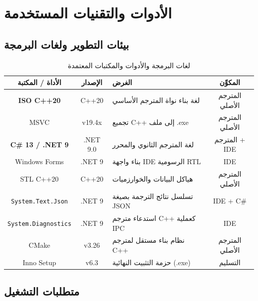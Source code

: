 \documentclass[12pt,a4paper]{report}
\begin{document}
\chapter{الأدوات والتقنيات المستخدمة}

\section{بيئات التطوير ولغات البرمجة}

\begin{table}[H]
\caption{\arabicfont لغات البرمجة والأدوات والمكتبات المعتمدة}
\label{tab:tools}
\centering
\begin{tabularx}{\textwidth}{|c|c|X|c|}
\hline
\rowcolor{TableHead}
\textbf{\arabicfont الأداة / المكتبة} & \textbf{\arabicfont الإصدار} & \textbf{\arabicfont الغرض} & \textbf{\arabicfont المكوِّن} \\
\hline
\textbf{ISO C++20} & C++20 & \arabicfont لغة بناء نواة المترجم الأساسي & \arabicfont المترجم الأصلي \\
\hline
\rowcolor{TableAlt}
MSVC & v19.4x & \arabicfont تجميع C++ إلى ملف .exe & \arabicfont المترجم الأصلي \\
\hline
\textbf{C\# 13 / .NET 9} & .NET 9.0 & \arabicfont لغة المترجم الثانوي والمحرر & \arabicfont المترجم + IDE \\
\hline
\rowcolor{TableAlt}
Windows Forms & .NET 9 & \arabicfont بناء واجهة IDE الرسومية RTL & \arabicfont IDE \\
\hline
STL C++20 & C++20 & \arabicfont هياكل البيانات والخوارزميات & \arabicfont المترجم الأصلي \\
\hline
\rowcolor{TableAlt}
\texttt{System.Text.Json} & .NET 9 & \arabicfont تسلسل نتائج الترجمة بصيغة JSON & \arabicfont IDE + C\# \\
\hline
\texttt{System.Diagnostics} & .NET 9 & \arabicfont استدعاء مترجم C++ كعملية IPC & \arabicfont IDE \\
\hline
\rowcolor{TableAlt}
CMake & v3.26 & \arabicfont نظام بناء مستقل لمترجم C++ & \arabicfont المترجم الأصلي \\
\hline
Inno Setup & v6.3 & \arabicfont حزمة التثبيت النهائية (.exe) & \arabicfont التسليم \\
\hline
\end{tabularx}
\end{table}

\section{متطلبات التشغيل}
\end{document}
